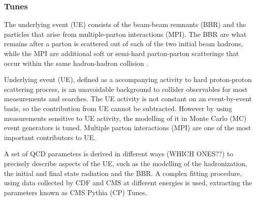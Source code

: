 \documentclass[11pt]{article}
\begin{document}
\subsubsection{Tunes}
\label{sec:org57a00f8}
The underlying event (UE) consists of the beam-beam remnants (BBR) and the particles that arise from multiple-parton interactions (MPI).
The BBR are what remains after a parton is scattered out of each of the two initial beam hadrons, while the MPI are additional soft or semi-hard parton-parton scatterings that occur within the same hadron-hadron collision \cite{CMS_Tunes}.

Underlying event (UE), defined as a accompanying activity to hard proton-proton scattering process,
is an unavoidable background to collider observables for most measurements and searches. The UE
activity is not constant on an event-by-event basis, so the contribution from UE cannot be subtracted.
However by using measurements sensitive to UE activity, the modelling of it in Monte Carlo (MC) event
generators is tuned. Multiple parton interactions (MPI) are one of the most important contributors to UE. \cite{hllhc_physics}

A set of QCD parameters is derived in different ways (WHICH ONES??) to precisely describe aspects of the UE, such as the modelling of the hadronization, the initial and final state radiation and the BBR.
A complex fitting procedure, using data collected by CDF and CMS at different energies is used, extracting the parameters known as CMS Pythia (CP) Tunes.
\end{document}
